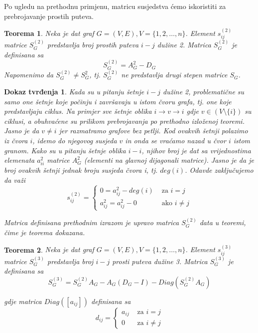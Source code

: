 \documentclass[11pt]{article}
\newtheorem{theorem}{Teorema}
\newtheorem*{custom_proof}{Dokaz tvrđenja}
\begin{document}
			Po ugledu na prethodnu primjenu, matricu susjedstva ćemo iskoristiti za prebrojavanje prostih puteva.
	
			\begin{theorem}
			Neka je dat graf $G = (V, E), V = \{1, 2, \dots, n\}$. Element $s_{ij}^{(2)}$ matrice $S_G^{(2)}$ predstavlja broj prostih puteva $i-j$ dužine 2. Matrica $S_G^{(2)}$ je definisana sa
			\[
			S_G^{(2)} = A_G^{2} - D_G
			\]  
			Napomenimo da $S_G^{(2)} \neq S_G^{2}$, tj. $S_G^{(2)}$ ne predstavlja drugi stepen matrice $S_G$.
			\end{theorem}
		
			\begin{custom_proof}
			Kada su u pitanju šetnje $i-j$ dužine 2, problematične su samo one šetnje koje počinju i završavaju u istom čvoru grafa, tj. one koje predstavljaju ciklus. 
		 	Na primjer sve šetnje oblika $i \rightarrow v \rightarrow i$ gdje $v \in (V \setminus \{i\})$ su ciklusi, a obuhvaćene su prilikom prebrojavanja po prethodno izloženoj teoremi.
			Jasno je da $v \neq i$ jer razmatramo grafove bez petlji. 
			Kod ovakvih šetnji polazimo iz čvora $i$, idemo do njegovog susjeda $v$ in onda se vraćamo nazad u čvor $i$ istom granom.
			Kako su u pitanju šetnje oblika $i-i$, njihov broj je dat sa vrijednostima elemenata $a_{ii}^2$ matrice $A_G^2$ (elementi na glavnoj dijagonali matrice). 
			Jasno je da je broj ovakvih šetnji jednak broju susjeda čvora i, tj. $deg(i)$. Odavde zaključujemo da važi
				\[
				s_{ij}^{(2)} = 
				 \begin{cases}
				 0 = a_{ij}^2 - deg(i) &  \text{ za } i = j  \\ 
				 a_{ij}^2 = a_{ij}^2 - 0   & \text{ ako } i \neq j 
				 \end{cases}
				\]  
		
			Matrica definisana prethodnim izrazom je upravo matrica $S_G^{(2)}$ data u teoremi, čime je teorema dokazana.
			\end{custom_proof}
	
			\begin{theorem}
			Neka je dat graf $G = (V, E), V = \{1, 2, \dots, n\}$. Element $s_{ij}^{(3)}$ matrice $S_G^{(3)}$ predstavlja broj $i-j$ prosti puteva dužine 3. Matrica $S_G^{(3)}$ je definisana sa
			\[
			S_G^{(3)} = S_G^{(2)} A_G - A_G (D_G - I) - Diag(S_G^{(2)} A_G) 
			\]  

			gdje matrica $Diag([a_{ij}])$ definisana sa
			\[
			d_{ij} = 
			 \begin{cases}
				a_{ij} &  \text{ za } i = j  \\ 
			 	0   & \text{ za } i \neq j 
			 \end{cases}
			\]
			\end{theorem}
	
\end{document}
